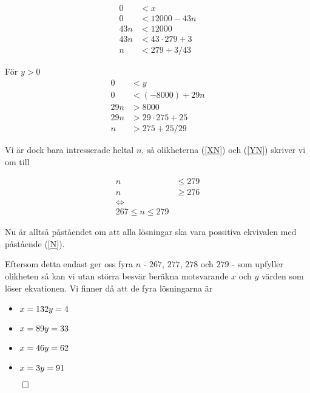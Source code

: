\documentclass{article}
\begin{document}
\begin{align*}
  0 &< x \\
  0 &< 12000 - 43n \\
  43n &< 12000 \\
  43n &< 43 \cdot 279 + 3 \\
  n &< 279 + 3 / 43 \label{XN}\tag{XN}
\end{align*}

För $y > 0$
\begin{align*}
  0 &< y \\
  0 &< (-8000) + 29n \\
  29n &> 8000 \\
  29n &> 29 \cdot 275 + 25 \\
  n &> 275 + 25 / 29 \label{YN}\tag{YN}
\end{align*}

Vi är dock bara intresserade heltal $n$, så olikheterna (\ref{XN}) och (\ref{YN}) skriver vi om till

\begin{align*}
  n &\leq 279 \\
  n &\geq 276 \\
  \iff \\
  267 \leq n \leq 279 \label{N}\tag{N}
\end{align*}

Nu är alltså påståendet om att alla lösningar ska vara possitiva ekvivalen med påstående (\ref{N}).

Eftersom detta endast ger oss fyra $n$ - $267$, $277$, $278$ och $279$ - som upfyller olikheten så kan vi utan störra besvär beräkna motsvarande $x$ och $y$ värden som löser ekvationen. Vi finner då att de fyra lösningarna är

\begin{itemize}
    \item $x = 132 \\ y = 4$

    \item $x = 89 \\ y = 33$

    \item $x = 46 \\ y = 62$

    \item $x = 3 \\ y = 91$
\end{itemize}

\centerline{$\qed$}
\end{document}
